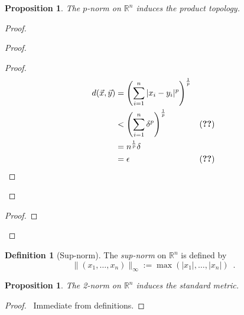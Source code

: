 \documentclass{book}
\let\qed\relax
\newtheorem{prop}[ax]{Proposition}
\theoremstyle{definition}
\newtheorem{df}[ax]{Definition}
\begin{document}
\begin{prop}
The $p$-norm on $\mathbb{R}^n$ induces the product topology.
\end{prop}

\begin{proof}
\pf
{}
\begin{proof}
	\begin{proof}
		\pf
		\begin{align*}
			d(\vec{x}, \vec{y}) & = \left( \sum_{i=1}^n |x_i - y_i|^p \right)^{\frac{1}{p}} \\
			& < \left( \sum_{i=1}^n \delta^p \right)^{\frac{1}{p}} & (\text{\stepref{d}}) \\
			& = n^{\frac{1}{p}} \delta \\
			& = \epsilon & (\text{\stepref{b}})
		\end{align*}
	\end{proof}
\end{proof}
\begin{proof}
\end{proof}
\qed
\end{proof}

\begin{df}[Sup-norm]
The \emph{sup-norm} on $\mathbb{R}^n$ is defined by
\[ \| (x_1, \ldots, x_n) \|_\infty := \max(|x_1|, \ldots, |x_n|) \enspace . \]
\end{df}

\begin{prop}
The 2-norm on $\mathbb{R}^n$ induces the standard metric.
\end{prop}

\begin{proof}
\pf\ Immediate from definitions. \qed
\end{proof}
\end{document}
